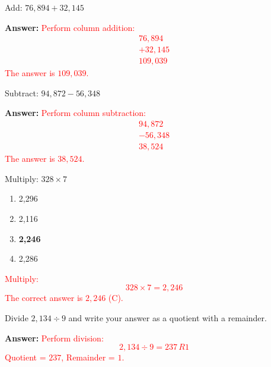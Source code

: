 \documentclass[12pt]{article}
\begin{document}
\begin{tcolorbox}[colframe=black!50, colback=white, title=\textbf{Problem 3 (4.NBT.B.4)}]
Add: \(76,894 + 32,145\)

\textbf{Answer:}  
\textcolor{red}{Perform column addition:  
\[
\begin{array}{r}
  76,894 \\
+ 32,145 \\
\hline
 109,039
\end{array}
\]  
The answer is \(109,039\).}
\end{tcolorbox}

\begin{tcolorbox}[colframe=black!50, colback=white, title=\textbf{Problem 4 (4.NBT.B.4)}]
Subtract: \(94,872 - 56,348\)

\textbf{Answer:}  
\textcolor{red}{Perform column subtraction:  
\[
\begin{array}{r}
  94,872 \\
- 56,348 \\
\hline
  38,524
\end{array}
\]  
The answer is \(38,524\).}
\end{tcolorbox}

\begin{tcolorbox}[colframe=black!50, colback=white, title=\textbf{Problem 5 (4.NBT.B.5)}]
Multiply: \(328 \times 7\)
\begin{enumerate}[label=(\Alph*)]
    \item 2,296
    \item 2,116
    \item \textbf{2,246}
    \item 2,286
\end{enumerate}

\textcolor{red}{Multiply:  
\[
328 \times 7 = 2,246
\]  
The correct answer is \(2,246\) (C).}
\end{tcolorbox}

\begin{tcolorbox}[colframe=black!50, colback=white, title=\textbf{Problem 6 (4.NBT.B.6)}]
Divide \(2,134 \div 9\) and write your answer as a quotient with a remainder.

\textbf{Answer:}  
\textcolor{red}{Perform division:  
\[
2,134 \div 9 = 237 \, R1
\]  
Quotient = \(237\), Remainder = \(1\).}
\end{tcolorbox}
\end{document}
